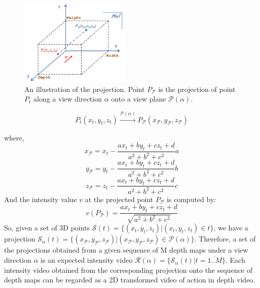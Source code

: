 \documentclass[final,3p,times,twocolumn]{elsarticle}
\begin{document}
\begin{figure}
	\centering
	\includegraphics[width=0.47\textwidth]{Figure_PointProjection.pdf} %
	\caption{\label{lbl:Figure_PointProjection}An illustration of the projection. Point $P_\mathcal{P}$ is the projection of point $P_t$ along a view direction $\alpha$ onto a view plane $\mathcal{P}(\alpha)$.}
\end{figure}

\begin{equation}
	P_t(x_t,y_t,z_t)\xrightarrow{\mathcal{P}(\alpha)}P_\mathcal{P}(x_\mathcal{P},y_\mathcal{P},z_\mathcal{P})
\end{equation}

where,
\begin{equation}
	x_\mathcal{P} = x_t - \frac{ax_t + by_t + cz_t + d}{a^2 + b^2 + c^2}a
\end{equation}
\begin{equation}
	y_\mathcal{P} = y_t - \frac{ax_t + by_t + cz_t + d}{a^2 + b^2 + c^2}b
\end{equation}
\begin{equation}
	z_\mathcal{P} = z_t - \frac{ax_t + by_t + cz_t + d}{a^2 + b^2 + c^2}c
\end{equation}
And the intensity value $v$ at the projected point $P_\mathcal{P}$ is computed by:
\begin{equation}
	v(P_\mathcal{P}) = \frac{ax_t + by_t + cz_t + d}{\sqrt{a^2 + b^2 + c^2}}
\end{equation}
So, given a set of 3D points $\mathcal{S}(t) = \{(x_t,y_t,z_t)\vert(x_t,y_t,z_t) \in t\}$, we have a projection $\mathcal{S}_\alpha(t) = \{(x_\mathcal{P},y_\mathcal{P},z_\mathcal{P})\vert(x_\mathcal{P},y_\mathcal{P},z_\mathcal{P}) \in \mathcal{P}(\alpha)\}$. Therefore, a set of the projections obtained from a given sequence of M depth maps under a view direction $\alpha$ is an expected intensity video $\mathcal{R}(\alpha) = \{\mathcal{S}_\alpha(t) \vert t=\overline{1..M}\}$. Each intensity video obtained from the corresponding projection onto the sequence of depth maps can be regarded as a 2D transformed video of action in depth video.
\end{document}
